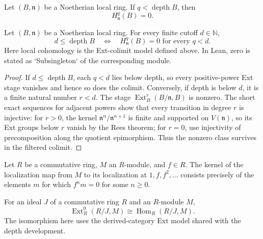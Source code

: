 \begin{lemma}\label{lem:lc-vanishes-below-depth}
Let $(B,\mathfrak n)$ be a Noetherian local ring. If
$q<\operatorname{depth}B$, then
\[
 H^q_{\mathfrak n}(B)=0.
\]
\leanok
\end{lemma}

\begin{theorem}\label{thm:depth-cutoff}
Let $(B,\mathfrak n)$ be a Noetherian local ring. For every finite cutoff
$d\in\mathbb N$,
\[
 d\le\operatorname{depth}B
 \quad\Longleftrightarrow\quad
 H^q_{\mathfrak n}(B)=0\text{ for every }q<d.
\]
Here local cohomology is the Ext-colimit model defined above. In Lean, zero
is stated as `Subsingleton` of the corresponding module.
\leanok
\end{theorem}
\begin{proof}
If $d\le\operatorname{depth}B$, each $q<d$ lies below depth, so every
positive-power Ext stage vanishes and hence so does the colimit. Conversely,
if depth is below $d$, it is a finite natural number $r<d$. The stage
$\operatorname{Ext}^r_B(B/\mathfrak n,B)$ is nonzero. The short exact
sequences for adjacent powers show that every transition in degree $r$ is
injective: for $r>0$, the kernel $\mathfrak n^n/\mathfrak n^{n+1}$ is finite
and supported on $V(\mathfrak n)$, so its Ext groups below $r$ vanish by the
Rees theorem; for $r=0$, use injectivity of precomposition along the quotient
epimorphism. Thus the nonzero class survives in the filtered colimit.
\end{proof}

\begin{lemma}\label{lem:principal-localization-torsion}
Let $R$ be a commutative ring, $M$ an $R$-module, and $f\in R$. The
kernel of the localization map from $M$ to its localization at
$1,f,f^2,\ldots$ consists precisely of the elements $m$ for which
$f^n m=0$ for some $n\ge0$.
\leanok
\end{lemma}

\begin{lemma}\label{lem:ext-zero-quotient-hom}
For an ideal $J$ of a commutative ring $R$ and an $R$-module $M$,
\[
 \operatorname{Ext}^0_R(R/J,M)\cong\operatorname{Hom}_R(R/J,M).
\]
The isomorphism here uses the derived-category Ext model shared with the
depth development.
\leanok
\end{lemma}

